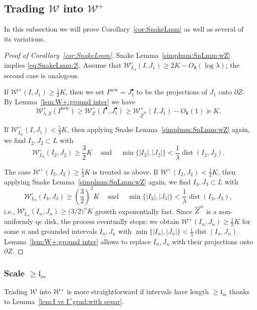 \documentclass{amsart}
\renewcommand{\sp}{{\ \ }}
\newcommand{\1}{{\mathbb 1 }}
\newcommand{\Width}{{\mathcal W}}
\newcommand{\wZ}{{\widehat Z}}
\newcommand{\length}{{\mathfrak l}}
\newcommand\new{{\operatorname{new}}}
\theoremstyle{remark}
\numberwithin{equation}{section}
\theoremstyle{definition}
\newcommand{\dist}{\operatorname{dist}}
\newcommand{\bdelta}{{\boldsymbol{ \delta}}}
\begin{document}
\subsection{Trading $\Width$ into $\Width^+$} In this subsection we will prove Corollary~\ref{cor:SnakeLmm} as well as several of its variations.
\begin{proof}[Proof of Corollary~\ref{cor:SnakeLmm}]
Snake Lemma~\ref{simplmm:SnLmm:wZ} implies \eqref{eq:SnakeLmm:2}. Assume that $\Width^\circ_{L_a}(I,J_1)\ge 2K - O_\bdelta(\log \lambda)$; the second case is analogous.

If $\Width^+(I,J_1)\ge \frac 13 K$, then  we set $I^\new=J_1^\bullet$ to be the projections of $J_1$ onto $\partial Z$. By Lemma~\ref{lem:W+:ground inter} we have 
\[  \Width^+_{\lambda,  Z}(I^\new) \ge \Width_{ Z}^+(I^\bullet, J^\bullet_1) \ge \Width^+_{ \wZ^m}(I,J_1)-O_\bdelta(1)\succeq K.\]

If $\Width^+_{L_a}(I,J_1)< \frac 5 3 K$, then applying Snake Lemma~\ref{simplmm:SnLmm:wZ}  again, we find $I_2,J_2\subset L$ with \[\Width^\circ_{L_2} (I_2,J_2)\ge \frac 3 2  K \sp\sp \text{ and }\sp\sp  \min\{|I_2|,|J_2|\} < \frac 1 \lambda \dist(I_2,J_2).\] 

The case $\Width^+(I_2,J_2)\ge \frac 13 K$ is treated as above. If  $\Width^+(I_2,J_2)< \frac 13 K$, then applying Snake Lemma~\ref{simplmm:SnLmm:wZ} again, we find $I_3,J_3\subset L$ with \[\Width^\circ_{L_3} (I_3,J_3)\ge \left(\frac 32\right)^2 K \sp\sp \text{ and }\sp\sp  \min\{|I_3|,|J_3|\} < \frac 1 \lambda \dist(I_3,J_3),\]
i.e., $\Width^\circ_{L_n}(I_n,J_n)\ge \big(3/2\big)^n K$ growth exponentially fast. Since $\wZ^m$ is a non-uniformly qc disk, the process eventually stops: we obtain $\Width^+(I_n, J_n)\ge \frac 1 3K $ for some $n$ and grounded intervals $I_n,J_n$ with $\min\{|I_n|,|J_n|\}<\frac 1 \lambda\dist(I_n,J_n)$. Lemma~\ref{lem:W+:ground inter} allows to replace $I_n,J_n$ with their projections onto $\partial Z$.
\end{proof} 




\subsubsection{Scale $\ge \length_m$} Trading $\Width$ into $\Width^+$ is more straightforward if intervals have length $\ge \length_m$ thanks to Lemma~\ref{lem:I vs I^grnd:with separ}.
\end{document}
